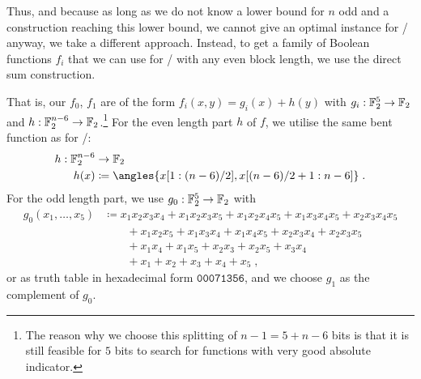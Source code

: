 Thus, and because as long as we do not know a lower bound for $n$ odd and a construction reaching this lower bound, we cannot give an optimal instance for \wisent/ anyway, we take a different approach.
Instead, to get a family of Boolean functions $f_i$ that we can use for \wisent/ with any even block length, we use the direct sum construction.

That is, our $f_0$, $f_1$ are of the form $f_i(x,y) = g_i(x) + h(y)$ with $g_i : \mathbb{F}_2^5 \to \mathbb{F}_2$ and $h : \mathbb{F}_2^{n-6} \to \mathbb{F}_2$.\footnote{%
    The reason why we choose this splitting of $n-1 = 5 + n-6$ bits is that it is still feasible for $5$ bits to search for functions with very good absolute indicator.
}
For the even length part $h$ of $f$, we utilise the same bent function as for \bison/:
\begin{align*}
    h : \F_2^{n-6} &\to \F_2 \\
    h(x) &\coloneqq \angles{x[1 : (n-6)/2], x[(n-6)/2 + 1 : n-6]}\;.
\end{align*}
For the odd length part, we use $g_0 : \mathbb{F}_2^5 \to \mathbb{F}_2$ with
\begin{align*}
    g_0(x_1, \ldots, x_5) %
                          &\coloneqq x_1x_2x_3x_4 + x_1x_2x_3x_5 + x_1x_2x_4x_5 + x_1x_3x_4x_5 + x_2x_3x_4x_5 \\
                          &\qquad    + x_1x_2x_5 + x_1x_3x_4 + x_1x_4x_5 + x_2x_3x_4 + x_2x_3x_5 \\
                          &\qquad    + x_1x_4 + x_1x_5 + x_2x_3 + x_2x_5 + x_3x_4 \\
                          &\qquad    + x_1 + x_2 + x_3 + x_4 + x_5\;,
\end{align*}
or as truth table in hexadecimal form $\mathtt{00071356}$, and we choose $g_1$ as the complement of $g_0$.

